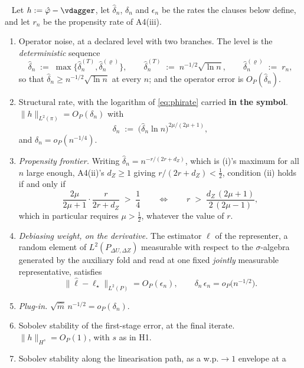 \begin{assumption}\label{ass:rates}~
Let $h:=\hat\varphi-\vdagger$, let $\hat\delta_n$, $\delta_n$ and $\epsilon_n$ be the rates the clauses
below define, and let $r_n$ be the propensity rate of A4(iii).
\begin{enumerate}
\item[(i)] Operator noise, at a declared level with two branches. The level is the
\emph{deterministic} sequence
\[
\hat\delta_n\;:=\;\max\big\{\hat\delta_n^{(T)},\hat\delta_n^{(\varrho)}\big\},
\qquad
\hat\delta_n^{(T)}\;:=\;n^{-1/2}\sqrt{\ln n},
\qquad
\hat\delta_n^{(\varrho)}\;:=\;r_n ,
\]
so that $\hat\delta_n\ge n^{-1/2}\sqrt{\ln n}$ at every $n$; and the operator error is
$O_P(\hat\delta_n)$.
\item[(ii)] Structural rate, with the logarithm of \eqref{eq:phirate} carried \textbf{in the
symbol}. $\|h\|_{L^2(\pi)}=O_P(\delta_n)$ with
\[
\delta_n\;:=\;\big(\hat\delta_n\ln n\big)^{2\mu/(2\mu+1)} ,
\]
and $\delta_n=o_P(n^{-1/4})$.
\item[(iii)] \emph{Propensity frontier.} Writing $\hat\delta_n=n^{-r/(2r+d_Z)}$, which is
\textup{(i)}'s maximum for all $n$ large enough, A4(ii)'s $d_Z\ge1$ giving $r/(2r+d_Z)<\tfrac12$, 
condition (ii) holds if and only if
\begin{equation}\label{eq:frontier}
\frac{2\mu}{2\mu+1}\cdot\frac{r}{2r+d_Z}\;>\;\frac14
\qquad\Longleftrightarrow\qquad
r\;>\;\frac{d_Z\,(2\mu+1)}{2\,(2\mu-1)},
\end{equation}
which in particular requires $\mu>\tfrac12$, whatever the value of $r$.
\item[(iv)] \emph{Debiasing weight, on the derivative.} The estimator $\hat\ell$ of the representer, a
random element of $L^{2}(P_{\Delta U,\Delta Z})$ measurable with respect to the $\sigma$-algebra generated
by the auxiliary fold and read at one fixed \emph{jointly} measurable representative, satisfies
\[
\big\|\hat\ell-\ell_\star\big\|_{L^{2}(P)}=O_P(\epsilon_n),
\qquad \delta_n\,\epsilon_n=o_P\big(n^{-1/2}\big).
\]
\item[(v)] \emph{Plug-in.} $\sqrt{\hat m}\,n^{-1/2}=o_P(\delta_n)$.
\item[(vi)] Sobolev stability of the first-stage error, at the final iterate.
$\|h\|_{H^{s}}=O_P(1)$, with $s$ as in H1.
\item[(vi$'$)] Sobolev stability along the linearisation path, as a w.p.$\to1$ envelope at a

\end{enumerate}
\end{assumption}
